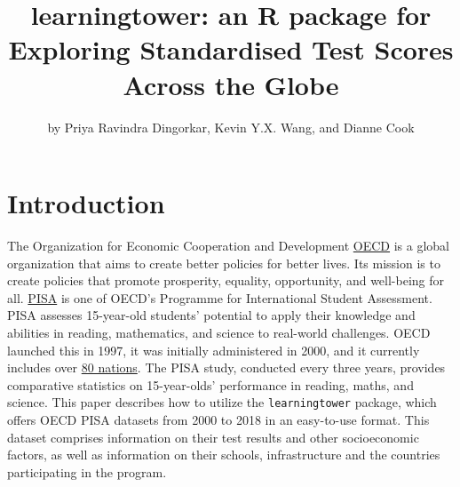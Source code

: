 \title{learningtower: an R package for Exploring Standardised Test
Scores Across the Globe}
\author{by Priya Ravindra Dingorkar, Kevin Y.X. Wang, and Dianne Cook}

\maketitle


\hypertarget{introduction}{%
\section{Introduction}\label{introduction}}

The Organization for Economic Cooperation and Development
\href{https://www.oecd.org/about/}{OECD} is a global organization that
aims to create better policies for better lives. Its mission is to
create policies that promote prosperity, equality, opportunity, and
well-being for all. \citep{oecd} \href{https://www.oecd.org/pisa/}{PISA}
is one of OECD's Programme for International Student Assessment. PISA
assesses 15-year-old students' potential to apply their knowledge and
abilities in reading, mathematics, and science to real-world challenges.
OECD launched this in 1997, it was initially administered in 2000, and
it currently includes over
\href{https://www.oecd.org/pisa/aboutpisa/pisa-participants.htm}{80
nations}. \citep{pisa} The PISA study, conducted every three years,
provides comparative statistics on 15-year-olds' performance in reading,
maths, and science. This paper describes how to utilize the
\texttt{learningtower} package, which offers OECD PISA datasets from
2000 to 2018 in an easy-to-use format. This dataset comprises
information on their test results and other socioeconomic factors, as
well as information on their schools, infrastructure and the countries
participating in the program.


